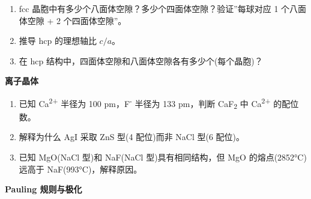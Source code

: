 \begin{enumerate}
\def\labelenumi{\arabic{enumi}.}
\setcounter{enumi}{8}
\item
  fcc 晶胞中有多少个八面体空隙？多少个四面体空隙？验证''每球对应 1 个八面体空隙 + 2 个四面体空隙''。
\item
  推导 hcp 的理想轴比 \(c/a\)。
\item
  在 hcp 结构中，四面体空隙和八面体空隙各有多少个(每个晶胞)？
\end{enumerate}

\textbf{离子晶体}

\begin{enumerate}
\def\labelenumi{\arabic{enumi}.}
\setcounter{enumi}{11}
\item
  已知 Ca\textsuperscript{2+} 半径为 100 pm，F\textsuperscript{-} 半径为 133 pm，判断 CaF\textsubscript{2} 中 Ca\textsuperscript{2+} 的配位数。
\item
  解释为什么 AgI 采取 ZnS 型(4 配位)而非 NaCl 型(6 配位)。
\item
  已知 MgO(NaCl 型)和 NaF(NaCl 型)具有相同结构，但 MgO 的熔点(2852°C)远高于 NaF(993°C)，解释原因。
\end{enumerate}

\textbf{Pauling 规则与极化}

